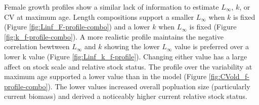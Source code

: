 \documentclass[11pt,
  english,
  a4paper,
]{article}
\begin{document}
\leavevmode\tagmcend\tagstructend\par


Female growth profiles show a similar lack of information to estimate {\(L_{\infty}\)\leavevmode\tagmcend\tagstructend}, {\(k\)\leavevmode\tagmcend\tagstructend}, or CV at maximum age. Length compositions support a smaller {\(L_{\infty}\)\leavevmode\tagmcend\tagstructend} when {\(k\)\leavevmode\tagmcend\tagstructend} is fixed (Figure \ref{fig:Linf_F-profile-combo}) and a lower {\(k\)\leavevmode\tagmcend\tagstructend} when {\(L_{\infty}\)\leavevmode\tagmcend\tagstructend} is fixed (Figure \ref{fig:k_f-profile-combo}). A more realistic profile maintains the negative correlation bewtween {\(L_{\infty}\)\leavevmode\tagmcend\tagstructend} and {\(k\)\leavevmode\tagmcend\tagstructend} showing the lower {\(L_{\infty}\)\leavevmode\tagmcend\tagstructend} value is preferred over a lower k value (Figure \ref{fig:Linf_k_f-profile}). Changing either value has a large affect on stock scale and relative stock status. The profile over the variability at maximum age supported a lower value than in the model (Figure \ref{fig:CVold_f-profile-combo}). The lower values increased overall popluation size (particularly current biomass) and derived a noticeably higher current relative stock status.

\leavevmode\tagmcend\tagstructend\par

\end{document}
